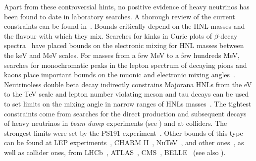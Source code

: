 Apart from these controversial hints, no positive evidence of heavy neutrinos has been found to date in laboratory searches.
A thorough review of the current constraints can be found in~. 
Bounds critically depend on the HNL masses and the flavour with which they mix.
Searches for kinks in Curie plots of $\beta$-decay spectra~\cite{Galeazzi:2001py, Hiddemann:1995ce, Holzschuh:1999vy, %
Holzschuh:2000nj, Deutsch:1990ut} have placed bounds on the electronic mixing for HNL masses between the keV and MeV scales.  
%
For masses from a few MeV to a few hundreds MeV, searches for monochromatic peaks %
in the lepton spectrum of decaying pions and kaons place important bounds on the muonic and %
electronic mixing angles~\cite{Artamonov:2014urb, Britton:1992pg, Britton:1992xv, Aguilar-Arevalo:2017vlf, Aguilar-Arevalo:2019owf}.
Neutrinoless double beta decay indirectly constrains Majorana HNLs from the eV to the TeV scale %
and lepton number violating meson and tau decays can be used to set limits on the mixing angle %
in narrow ranges of HNLs masses~\cite{Atre:2009rg}. 
%
%
The tightest constraints come from searches for the direct production and subsequent decays of heavy neutrinos %
in \emph{beam dump} experiments (see ) and at colliders.
The strongest limits were set by the PS191 experiment~\cite{Bernardi:1985ny, Bernardi:1987ek}.
Other bounds of this type can be found at LEP experiments~\cite{Abreu:1996pa, Adriani:1992pq}, CHARM II~\cite{Vilain:1994vg}, %
NuTeV~\cite{Vaitaitis:1999wq}, and other ones~\cite{Badier:1985wg, CooperSarkar:1985nh, Gallas:1994xp}, %
as well as collider ones, from LHCb~\cite{Aaij:2014aba}, ATLAS~\cite{Aaboud:2018spl}, CMS~\cite{Sirunyan:2018mtv, Sirunyan:2018xiv}, %
BELLE~\cite{Liventsev:2013zz} (see also ).

%



